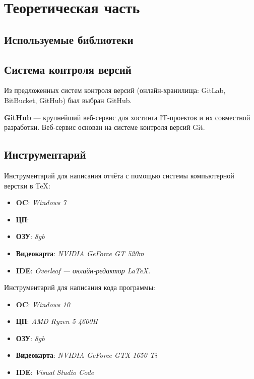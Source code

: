 \documentclass[14pt, oneside]{altsu-report}
\begin{document}

\chapter{Теоретическая часть}\label{ch1}
\section{Используемые библиотеки}

\section{Система контроля версий}
Из предложенных систем контроля версий (онлайн-хранилища: GitLab, BitBucket, GitHub) был выбран GitHub.

\textbf{GitHub} — крупнейший веб-сервис для хостинга IT-проектов и их совместной разработки. Веб-сервис основан на системе контроля версий Git.


\section{Инструментарий}
Инструментарий для написания отчёта с помощью системы компьютерной верстки в \TeX:
    \begin{itemize}
        \item \textbf{OC}: \textit{Windows 7}
        \item \textbf{ЦП}: \textit{}
        \item \textbf{ОЗУ}: \textit{8gb}
        \item \textbf{Видеокарта}: \textit{NVIDIA GeForce GT 520m}
        \item \textbf{IDE}: \textit{Overleaf — онлайн-редактор LaTeX.}
    \end{itemize}

Инструментарий для написания кода программы:
    \begin{itemize}
        \item \textbf{OC}: \textit{Windows 10}
        \item \textbf{ЦП}: \textit{AMD Ryzen 5 4600H}
        \item \textbf{ОЗУ}: \textit{8gb}
        \item \textbf{Видеокарта}: \textit{NVIDIA GeForce GTX 1650 Ti}
        \item \textbf{IDE}: \textit{Visual Studio Code}
    \end{itemize}
\end{document}
